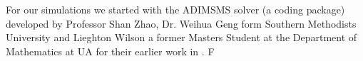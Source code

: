 For our simulations we started with the ADIMSMS solver (a coding package) developed by Professor Shan Zhao, Dr. Weihua Geng form Southern Methodists University and Lieghton Wilson a former Masters Student at the Department of Mathematics at UA for their earlier work in \cite{Geng2013_Fully, Wilson2016}. F 